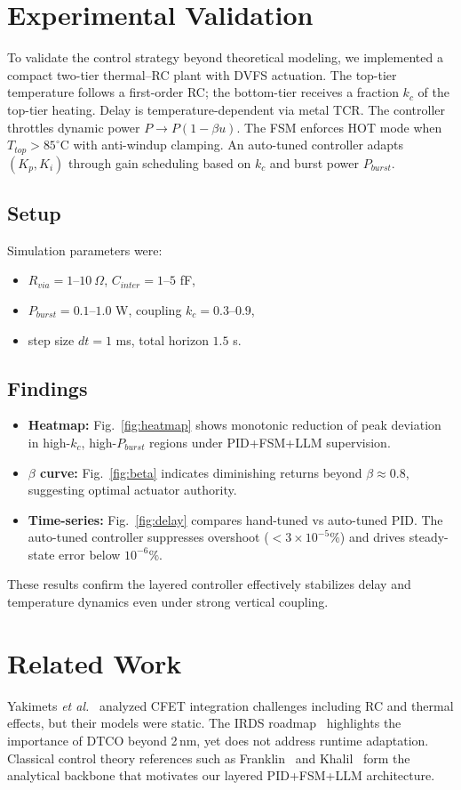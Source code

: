 \documentclass[conference]{IEEEtran}
\begin{document}
\section{Experimental Validation}
To validate the control strategy beyond theoretical modeling,
we implemented a compact two-tier thermal–RC plant with DVFS actuation. 
The top-tier temperature follows a first-order RC; 
the bottom-tier receives a fraction $k_c$ of the top-tier heating. 
Delay is temperature-dependent via metal TCR. 
The controller throttles dynamic power $P \to P(1-\beta u)$. 
The FSM enforces HOT mode when $T_{top}>85^\circ$C with anti-windup clamping. 
An auto-tuned controller adapts $(K_p,K_i)$ through gain scheduling 
based on $k_c$ and burst power $P_{burst}$.

\subsection{Setup}
Simulation parameters were:
\begin{itemize}
  \item $R_{via}=1\text{--}10~\Omega$, $C_{inter}=1\text{--}5$ fF,
  \item $P_{burst}=0.1\text{--}1.0$ W, coupling $k_c=0.3\text{--}0.9$,
  \item step size $dt=1$ ms, total horizon $1.5$ s.
\end{itemize}

\subsection{Findings}
\begin{itemize}
  \item \textbf{Heatmap:} Fig.~\ref{fig:heatmap} shows 
  monotonic reduction of peak deviation in high-$k_c$, high-$P_{burst}$ regions 
  under PID+FSM+LLM supervision.
  \item \textbf{$\beta$ curve:} Fig.~\ref{fig:beta} indicates diminishing returns 
  beyond $\beta \approx 0.8$, suggesting optimal actuator authority.
  \item \textbf{Time-series:} Fig.~\ref{fig:delay} compares hand-tuned vs auto-tuned PID. 
  The auto-tuned controller suppresses overshoot ($<3\times 10^{-5}\%$) 
  and drives steady-state error below $10^{-6}\%$.
\end{itemize}
These results confirm the layered controller effectively stabilizes 
delay and temperature dynamics even under strong vertical coupling.

\section{Related Work}
Yakimets \textit{et al.}~\cite{yakimets2020cfet} analyzed CFET
integration challenges including RC and thermal effects,
but their models were static.
The IRDS roadmap~\cite{irds2023} highlights the importance of DTCO
beyond 2\,nm, yet does not address runtime adaptation.
Classical control theory references such as Franklin~\cite{franklin2015feedback}
and Khalil~\cite{khalil2002nonlinear} form the analytical backbone
that motivates our layered PID+FSM+LLM architecture.
\end{document}
